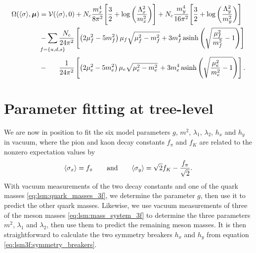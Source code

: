 \begin{equation}
\begin{split}
	\Omega(\avg{\sigma},\vec{\mu}) &= \pot(\avg{\sigma},0) + N_c \frac{m_x^4}{8 \pi^2} \Bigg[ \frac{3}{2} + \log\bigg(\frac{\Lambda_x^2}{m_x^2}\bigg) \Bigg] + N_c \frac{m_y^4}{16 \pi^2} \Bigg[ \frac{3}{2} + \log\bigg(\frac{\Lambda_y^2}{m_y^2}\bigg) \Bigg] \\ %
	                               &-\smashoperator{\sum_{\vphantom{\big|} f=\{u,d,s\}}} \frac{N_c}{24 \pi^2} \left[ \left( 2 \mu_f^2 - 5 m_f^2 \right) \mu_f \sqrt{\mu_f^2 - m_f^2} + 3 m_f^4 \asinh \left( \sqrt{\frac{\mu_{\smash{f}}^2}{m_f^2}-1} \right) \right] \\
	                               &-\phantom{\sum} \, \frac{1}{24 \pi^2} \left[ \left( 2 \mu_e^2 - 5 m_e^2 \right) \mu_e \sqrt{\mu_e^2 - m_e^2} \, + 3 m_e^4 \asinh \left( \sqrt{\frac{\mu_{\smash{e}}^2}{m_e^2}-1} \right) \right].
\end{split}
\label{eq:lsm3f:grand_potential}
\end{equation}

\section{Parameter fitting at tree-level}
\label{sec:lsm3f:parameter_fit}

We are now in position to fit the six model parameters $g$, $m^2$, $\lambda_1$, $\lambda_2$, $h_x$ and $h_y$ in vacuum,
where the pion and kaon decay constants $f_\pi$ and $f_K$ are related to the nonzero expectation values by
\cite{ref:lsm3f_details}
\begin{equation}
	\langle \sigma_x \rangle = f_\pi
	\qquad \text{and} \qquad
	\langle \sigma_y \rangle = \sqrt{2} f_K - \frac{f_\pi}{\sqrt{2}}.
\label{eq:lsm3f:decay_constants}
\end{equation}
With vacuum measurements of the two decay constants and one of the quark masses \eqref{eq:lsm:quark_masses_3f},
we determine the parameter $g$, then use it to predict the other quark masses.
Likewise, we use vacuum measurements of three of the meson masses \eqref{eq:lsm:mass_system_3f} to determine the three parameters $m^2$, $\lambda_1$ and $\lambda_2$,
then use them to predict the remaining meson masses.
It is then straightforward to calculate the two symmetry breakers $h_x$ and $h_y$ from equation \eqref{eq:lsm3f:symmetry_breakers}.

